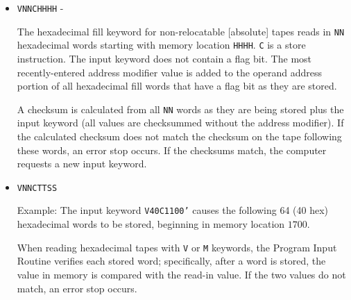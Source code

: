 \documentclass{article}
\begin{document}
\begin{enumerate}
\begin{itemize}

The address modifier (see below) is added to the operand address portion of each flagged word before it is stored.

A checksum is calculated from all \texttt{NN} words as they are being stored plus the input keyword (all values are checksummed without the address modifier). If the calculated checksum does not match the checksum on the tape following these words, an error stop occurs. If the checksums match, the computer requests a new input keyword.

Example: Let the modifier be $1200$ (decimal) and the input keyword be M40K1201' (hexadecimal). The next 64 (40 hex) hexadecimal words are read and modified (if they have a flag bit) and are stored consecutively, beginning in memory location $3000$.

\item \texttt{VNNCHHHH} - 

The hexadecimal fill keyword for non-relocatable [absolute] tapes reads in \texttt{NN} hexadecimal words starting with memory location \texttt{HHHH}. \texttt{C} is a store instruction. The input keyword does not contain a flag bit. The most recently-entered address modifier value is added to the operand address portion of all hexadecimal fill words that have a flag bit as they are stored.

A checksum is calculated from all \texttt{NN} words as they are being stored plus the input keyword (all values are checksummed without the address modifier). If the calculated checksum does not match the checksum on the tape following these words, an error stop occurs. If the checksums match, the computer requests a new input keyword.


\item \texttt{VNNCTTSS} 

Example: The input keyword \texttt{V40C1100'} causes the following 64 (40 hex) hexadecimal words to be stored, beginning in memory location $1700$.

When reading hexadecimal tapes with \texttt{V} or \texttt{M} keywords, the Program Input Routine verifies each stored word; specifically, after a word is stored, the value in memory is compared with the read-in value. If the two values do not match, an error stop occurs.


\end{itemize}
\end{enumerate}
\end{document}
